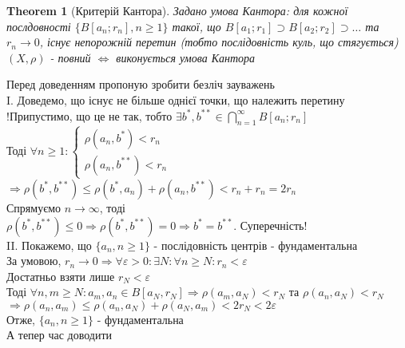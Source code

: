 \documentclass[a4paper, 14pt]{extarticle}
\def\huge{\displaystyle}
\theoremstyle{theoremdd}
\newtheorem{theorem}{Theorem}[subsection]
\theoremstyle{theoremdd}
\theoremstyle{theoremdd}
\theoremstyle{theoremdd}
\theoremstyle{theoremdd}
\theoremstyle{theoremdd}
\theoremstyle{theoremdd}
\theoremstyle{theoremdd}
\begin{document}
\begin{theorem}[Критерій Кантора]
Задано умова Кантора: для кожної послдовності $\{B[a_n;r_n], n \geq 1\}$ такої, що $B[a_1;r_1] \supset B[a_2;r_2] \supset \dots$ та $r_n \to 0$, існує непорожній перетин (тобто послідовність куль, що стягується)\\
$(X,\rho)$ - повний $\iff$ виконується умова Кантора
\end{theorem}

Перед доведенням пропоную зробити безліч зауважень\\
I. Доведемо, що існує не більше однієї точки, що належить перетину\\
!Припустимо, що це не так, тобто $\exists b^*, b^{**} \in \huge \bigcap_{n=1}^\infty B[a_n;r_n]$\\
Тоді $\forall n \geq 1: \begin{cases} \rho(a_n, b^*) < r_n \\ \rho(a_n, b^{**}) < r_n \end{cases}$\\
$\Rightarrow \rho(b^*, b^{**}) \leq \rho(b^*,a_n) + \rho(a_n, b^{**}) < r_n + r_n = 2r_n$\\
Спрямуємо $n \to \infty$, тоді\\
$\rho(b^*,b^{**}) \leq 0 \Rightarrow \rho(b^*,b^{**}) = 0 \Rightarrow b^{*} = b^{**}$. Суперечність!
\bigskip \\
II. Покажемо, що $\{a_n, n \geq 1\}$ - послідовність центрів - фундаментальна\\
За умовою, $r_n \to 0 \Rightarrow \forall \varepsilon > 0: \exists N: \forall n \geq N: r_n < \varepsilon$\\
Достатньо взяти лише $r_N < \varepsilon$\\
Тоді $\forall n,m \geq N: a_m,a_n \in B[a_N,r_N] \Rightarrow \rho(a_m,a_N) < r_N$ та $\rho(a_n,a_N) < r_N$\\
$\Rightarrow \rho(a_n,a_m) \leq \rho(a_n,a_N) + \rho(a_N,a_m) < 2r_N < 2 \varepsilon$\\
Отже, $\{a_n, n \geq 1\}$ - фундаментальна\\
А тепер час доводити\\
\end{document}
